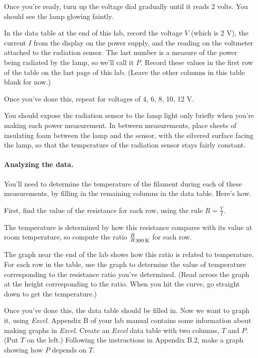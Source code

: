Once you're ready, turn up the voltage dial gradually until it reads 2 volts.
You should see the lamp glowing faintly.

In the data table at the end of this lab, record the voltage $V$ (which is 2 V),
the current $I$ from the display on the power supply,
and the reading on the voltmeter
attached to the radiation sensor. The last number is a measure
of the power being radiated by the lamp, so we'll call it $P$. 
Record these values
in the first row of the table on the last page of this lab. (Leave
the other columns in this table blank for now.)

Once you've done this, repeat for voltages of 4, 6, 8, 10, 12 V.

You should expose the radiation sensor to the lamp light only briefly
when you're making each power measurement. In between measurements, place 
sheets of insulating foam between the lamp and the sensor, with the silvered
surface facing the lamp, so that the temperature of the radiation sensor
stays fairly constant.


\paragraph{Analyzing the data.}
You'll need to determine the temperature of the filament during each of these
measurements, by filling in the remaining columns in the data table. Here's
how. 

First, find the value of the resistance for each row, using the rule $R=\frac{V}{I}$. 

The temperature is determined by how this resistance compares with its
value at room temperature, so compute the ratio ${\frac{R}{R}_{300\,{\rm K}}}$
for each row.

The graph near the end of the lab 
shows how this ratio is related to temperature.
For each row in the table, use the graph to determine the value of 
temperature corresponding to the resistance ratio you've determined.
(Read across the graph at the height corresponding to the ratio.
When you hit the curve, go straight down to get the temperature.)

Once you've done this, the data table should be filled in.
Now we want to graph it, using \textit{Excel}. Appendix B of your
lab manual contains some information about making graphs in \textit{Excel}.
Create an \textit{Excel} data table with two columns, $T$ and $P$. (Put
$T$ on the left.) Following the instructions in Appendix B.2, make
a graph showing how $P$ depends on $T$. 

